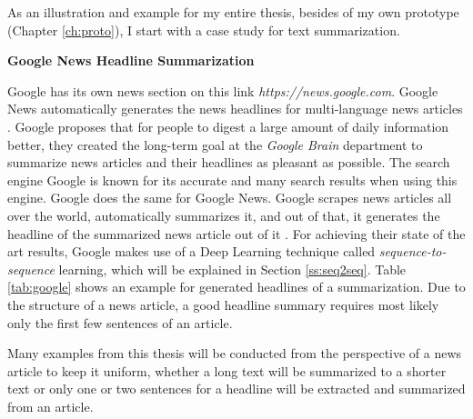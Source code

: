 As an illustration and example for my entire thesis, besides of my own prototype (Chapter \ref{ch:proto}), I start with a case study for text summarization.

\textbf{Google News Headline Summarization}

Google has its own news section on this link \textit{https://news.google.com}. Google News automatically generates the news headlines for multi-language news articles \cite{google}. Google proposes that for people to digest a large amount of daily information better, they created the long-term goal at the \textit{Google Brain} department to summarize news articles and their headlines as pleasant as possible. The search engine Google is known for its accurate and many search results when using this engine. Google does the same for Google News. Google scrapes news articles all over the world, automatically summarizes it, and out of that, it generates the headline of the summarized news article out of it \cite{google}. 
For achieving their state of the art results, Google makes use of a Deep Learning technique called \textit{sequence-to-sequence} learning, which will be explained in Section \ref{ss:seq2seq}. Table \ref{tab:google} shows an example for generated headlines of a summarization. Due to the structure of a news article, a good headline summary requires most likely only the first few sentences of an article.  

Many examples from this thesis will be conducted from the perspective of a news article to keep it uniform, whether a long text will be summarized to a shorter text or only one or two sentences for a headline will be extracted and summarized from an article. 


